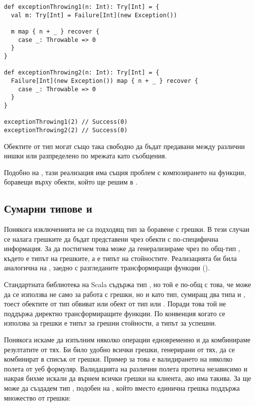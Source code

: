 \begin{lstlisting}
def exceptionThrowing1(n: Int): Try[Int] = {
  val m: Try[Int] = Failure[Int](new Exception())

  m map { n + _ } recover {
    case _: Throwable => 0
  }
}

def exceptionThrowing2(n: Int): Try[Int] = {
  Failure[Int](new Exception()) map { n + _ } recover {
    case _: Throwable => 0
  }
}

exceptionThrowing1(2) // Success(0)
exceptionThrowing2(2) // Success(0)
\end{lstlisting}

Обектите от тип  могат също така свободно да бъдат предавани между различни нишки или разпределено по мрежата като съобщения.

Подобно на , тази реализация има същия проблем с композирането на функции, боравещи върху  обекти, който ще решим в .

\subsection{Сумарни типове  и }
\label{sec:sum-types-either-validation}

Понякога изключенията не са подходящ тип за боравене с грешки. В тези случаи се налага грешките да бъдат представени чрез обекти с по-специфична информация. За да постигнем това може да генерализираме  чрез по общ-тип , където  е типът на грешките, а  е типът на стойностите. Реализацията би била аналогична на , заедно с разгледаните трансформиращи функции ().

Стандартната библиотека на Scala съдържа тип , но той е по-общ с това, че може да се използва не само за работа с грешки, но и като тип, сумиращ два типа  и , тоест обектите от тип  обвиват или обект от тип  или . Поради това той не поддържа директно трансформиращите функции. По конвенция когато се използва за грешки  е типът за грешни стойности, а  типът за успешни.

Понякога искаме да изпълним няколко операции едновременно и да комбинираме резултатите от тях. Би било удобно всички грешки, генерирани от тях, да се комбинират в списък от грешки. Пример за това е валидирането на няколко полета от уеб формуляр. Валидацията на различни полета протича независимо и накрая бихме искали да върнем всички грешки на клиента, ако има такива. За ще може да създадем тип , подобен на , който вместо единична грешка поддържа множество от грешки:

